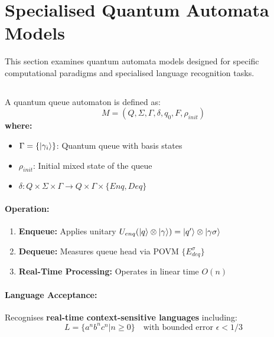\section{Specialised Quantum Automata Models}
\label{sec:specialised-qfa}

This section examines quantum automata models designed for specific computational paradigms and specialised language recognition tasks.

\subsection{}
\label{subsec:qqa}

\begin{definition}
A quantum queue automaton is defined as:
\[
M = (Q, \Sigma, \Gamma, \delta, q_0, F, \rho_{init})
\]
\textbf{where:}
\begin{itemize}
    \item $\Gamma = \{\ket{\gamma_i}\}$: Quantum queue with basis states
    \item $\rho_{init}$: Initial mixed state of the queue
    \item $\delta: Q \times \Sigma \times \Gamma \rightarrow Q \times \Gamma \times \{Enq, Deq\}$
\end{itemize}
\end{definition}

\paragraph{Operation:}
\begin{enumerate}
    \item \textbf{Enqueue:} Applies unitary $U_{enq}(\ket{q}\otimes\ket{\gamma}) = \ket{q'}\otimes\ket{\gamma\sigma}$
    \item \textbf{Dequeue:} Measures queue head via POVM $\{E_{deq}^\sigma\}$
    \item \textbf{Real-Time Processing:} Operates in linear time $O(n)$ \cite{yakaryilmaz2010succinctness}
\end{enumerate}

\paragraph{Language Acceptance:}
Recognises \textbf{real-time context-sensitive languages} including:
\[
L = \{a^nb^nc^n | n \geq 0\} \quad \text{with bounded error } \epsilon < 1/3
\]


